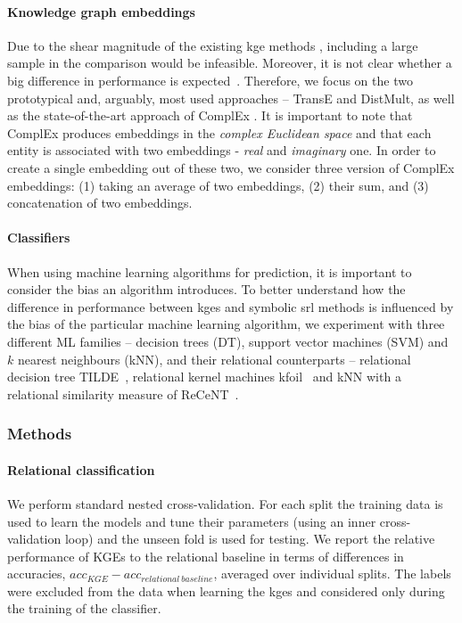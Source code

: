 \paragraph{Knowledge graph embeddings}
Due to the shear magnitude of the existing \gls{kge} methods \cite{EmbeddingsOverview}, including a large sample in the comparison would be infeasible.
Moreover, it is not clear whether a big difference in performance is expected~\cite{DBLP:conf/rep4nlp/KadlecBK17}.
Therefore, we focus on the two prototypical and, arguably, most used approaches -- TransE and DistMult, as well as the state-of-the-art approach of ComplEx \cite{trouillon2016complex}.
It is important to note that ComplEx produces embeddings in the \textit{complex Euclidean space} and that each entity is associated with two embeddings - \textit{real} and \textit{imaginary} one.
In order to create a single embedding out of these two, we consider three version of ComplEx embeddings: (1) taking an average of two embeddings, (2) their sum, and (3) concatenation of two embeddings.




\paragraph{Classifiers}
When using machine learning algorithms for prediction, it is important to consider the bias an algorithm introduces.
To better understand how the difference in performance between \gls{kge}s and symbolic \gls{srl} methods is influenced by the bias of the particular machine learning algorithm, we experiment with three different ML families -- decision trees (DT), support vector machines (SVM) and $k$ nearest neighbours (kNN), and their relational counterparts -- relational decision tree TILDE~\cite{Blockeel1998285}, relational kernel machines \gls{kfoil}~\cite{Landwehr:2006:KLS:1597538.1597601} and kNN with a relational similarity measure of ReCeNT~\cite{Dumancic2017a}.










\subsubsection{Methods}


\paragraph{Relational classification}
We perform standard nested cross-validation.
For each split the training data is used to learn the models and tune their parameters (using an inner cross-validation loop) and the unseen fold is used for testing.
We report the relative performance of KGEs to the relational baseline in terms of differences in accuracies, $acc_{KGE} - acc_{relational~ baseline}$, averaged over individual splits.
The labels were excluded from the data when learning the \gls{kge}s and considered only during the training of the classifier.


